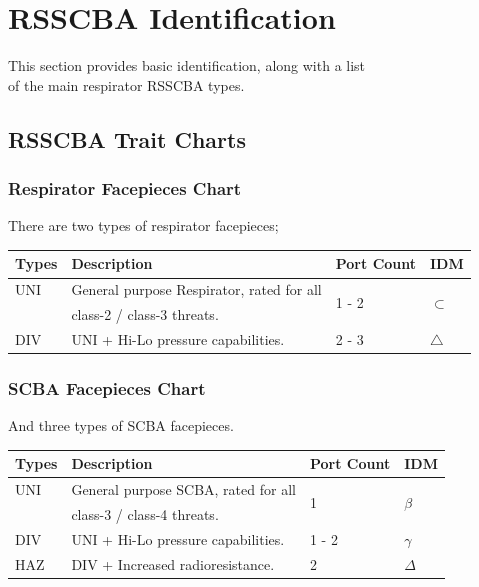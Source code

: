 \documentclass[a4paper, 12pt, oneside]{article}
\begin{document}
{		\newpage
				
		\section{RSSCBA Identification}
			This section provides basic  identification, along with a list \\
			of the main respirator RSSCBA types.
			\subsection{RSSCBA Trait Charts}
				\subsubsection{Respirator Facepieces Chart}
					There are two types of respirator facepieces;
					\begin{tabular}{|p{1cm}||p{7.5cm}|p{2.5cm}|p{1.135cm}|}
						\hline
						Types & Description & Port Count & IDM \\\hline
						UNI & General purpose Respirator, rated for all & \multirow{2}{3.57cm}{1 - 2} & \multirow{2}{1.135cm}{$\subset$} \\
						& class-2 / class-3 threats. &  &  \\
						DIV & UNI + Hi-Lo pressure capabilities. & 2 - 3 & $\triangle$ \\\hline
					\end{tabular}
				\subsubsection{SCBA Facepieces Chart}
					And three types of SCBA facepieces.
					\begin{tabular}{|p{1cm}||p{7.5cm}|p{2.5cm}|p{1.135cm}|}
						\hline
						Types & Description & Port Count & IDM \\\hline
						UNI & General purpose SCBA, rated for all & \multirow{2}{1.135cm}{1} & \multirow{2}{1.135cm}{$\beta$} \\
						  & class-3 / class-4 threats. &  &  \\
						DIV & UNI + Hi-Lo pressure capabilities. & 1 - 2 & $\gamma$ \\
						HAZ & DIV + Increased radioresistance. & 2 & $\Delta$ \\\hline
					\end{tabular}
}
\end{document}
